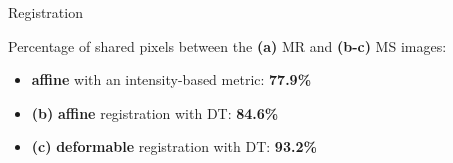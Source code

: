 \documentclass[10pt]{beamer}
\begin{document}
\begin{frame}{Registration}

  \vspace{-0.3cm}
  Percentage of shared pixels between the \textbf{(a)} MR and \textbf{(b-c)} MS images:
  \begin{itemize}
  \item \textbf{affine} with an intensity-based metric: \textbf{77.9\%}
  \item \textbf{(b)} \textbf{affine} registration with DT: \textbf{84.6\%}
  \item \textbf{(c)} \textbf{deformable} registration with DT: \textbf{93.2\%}
  \end{itemize}


\end{frame}
\end{document}

